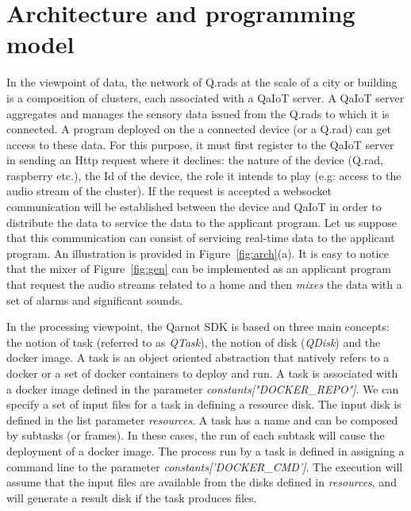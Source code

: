 \documentclass[10pt, conference, compsocconf]{IEEEtran}
\begin{document}
\section{Architecture and programming model} \label{Model}

In the viewpoint of data, the network of Q.rads at the scale of a city or building is a composition of clusters, each 
associated with a QaIoT server. A QaIoT server aggregates and manages the sensory data issued from the Q.rads to which it is 
connected. A program deployed on the a connected device (or a Q.rad) can get access to these data. For this purpose, 
it must first register to the QaIoT server in sending an Http request where it declines: the nature of the device (Q.rad, 
raspberry etc.), the Id of the device, the role it intends to play (e.g: access to the audio stream of the cluster). If the 
request is accepted a websocket communication will  be established between the device and QaIoT in order to distribute the data 
to service the data to the applicant program. Let us suppose that this communication can consist of servicing real-time data 
to the applicant program. An illustration is provided in Figure~\ref{fig:arch}(a). 
It is easy to notice that the mixer of Figure~\ref{fig:gen} can be implemented as an applicant program that request the audio streams  
related to a home and then {\it mixes} the data with a set of alarms and significant sounds.

In the processing viewpoint, the Qarnot SDK is based on three main concepts: the notion of task (referred to as {\it QTask}), 
the notion of disk ({\it QDisk}) and the docker image. A task is an object oriented abstraction that natively refers to a 
docker or a set of docker containers to deploy and run. A task is associated with a docker image defined in the 
parameter {\it constants["DOCKER\_REPO"]}. We can specify a set of input files for a task in defining a resource disk. 
The input disk is defined in the list parameter {\it resources}. A task has a name and can be composed by subtasks (or frames).  
In these cases, the run of each subtask will cause the deployment of a docker image. The process run by a task is defined in 
assigning a command line to the parameter {\it constants['DOCKER\_CMD']}. The execution will assume that the input files are available 
from the disks defined in {\it resources}, and will generate a result disk if the task produces files.
\end{document}
